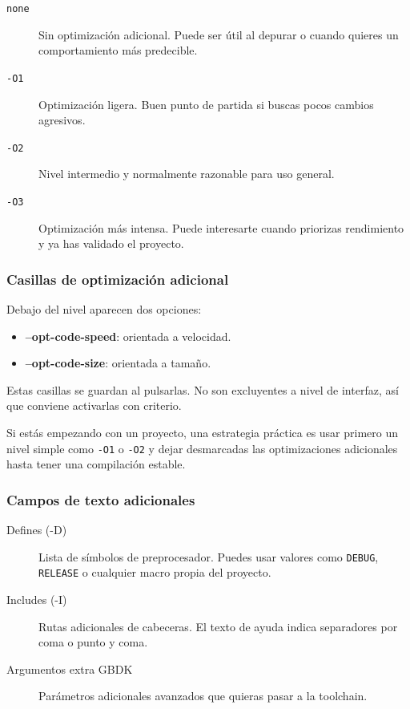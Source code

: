 \documentclass[../../main.tex]{subfiles}
\begin{document}
\begin{description}
    \item[\texttt{none}] Sin optimización adicional. Puede ser útil al depurar o cuando quieres un comportamiento más predecible.
    \item[\texttt{-O1}] Optimización ligera. Buen punto de partida si buscas pocos cambios agresivos.
    \item[\texttt{-O2}] Nivel intermedio y normalmente razonable para uso general.
    \item[\texttt{-O3}] Optimización más intensa. Puede interesarte cuando priorizas rendimiento y ya has validado el proyecto.
\end{description}

\subsubsection{Casillas de optimización adicional}

Debajo del nivel aparecen dos opciones:

\begin{itemize}
    \item \textbf{--opt-code-speed}: orientada a velocidad.
    \item \textbf{--opt-code-size}: orientada a tamaño.
\end{itemize}

Estas casillas se guardan al pulsarlas. No son excluyentes a nivel de interfaz, así que conviene activarlas con criterio.

Si estás empezando con un proyecto, una estrategia práctica es usar primero un nivel simple como \texttt{-O1} o \texttt{-O2} y dejar desmarcadas las optimizaciones adicionales hasta tener una compilación estable.

\subsubsection{Campos de texto adicionales}

\begin{description}
    \item[Defines (-D)] Lista de símbolos de preprocesador. Puedes usar valores como \texttt{DEBUG}, \texttt{RELEASE} o cualquier macro propia del proyecto.
    \item[Includes (-I)] Rutas adicionales de cabeceras. El texto de ayuda indica separadores por coma o punto y coma.
    \item[Argumentos extra GBDK] Parámetros adicionales avanzados que quieras pasar a la toolchain.
\end{description}
\end{document}
